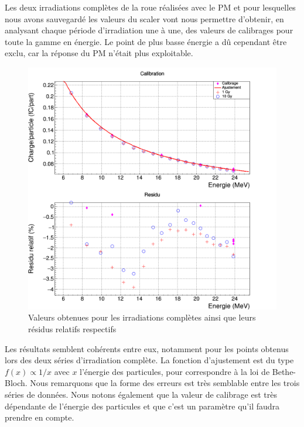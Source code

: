 \documentclass[a4paper,11pt]{article}
\begin{document}
Les deux irradiations complètes de la roue réalisées avec le PM et pour lesquelles nous avons sauvegardé les valeurs du scaler vont nous permettre d’obtenir, en analysant chaque période d’irradiation une à une, des valeurs de calibrages pour toute la gamme en énergie. 
Le point de plus basse énergie a dû cependant être exclu, car la réponse du PM n’était plus exploitable.
\begin{figure}[h]
\begin{center}
\includegraphics[scale=0.4]{Calibration.png} 
\caption{\label{fig:calib}\footnotesize{Valeurs obtenues pour les irradiations complètes ainsi que leurs résidus relatifs respectifs}}
\end{center}
\end{figure}

Les résultats semblent cohérents entre eux, notamment pour les points obtenus lors des deux séries d’irradiation complète. 
La fonction d'ajustement est du type $f(x)\propto 1/x$ avec $x$ l'énergie des particules, pour correspondre à la loi de Bethe-Bloch.
Nous remarquons que la forme des erreurs est très semblable entre les trois séries de données.
Nous notons également que la valeur de calibrage est très dépendante de l’énergie des particules et que c’est un paramètre qu’il faudra prendre en compte.
\end{document}
